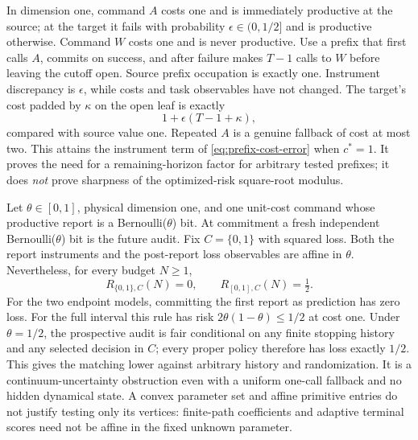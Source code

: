 \begin{example}\label{ex:cost-horizon}
In dimension one, command $A$ costs one and is immediately productive at the source; at the target it fails with probability $\epsilon\in(0,1/2]$ and is productive otherwise. Command $W$ costs one and is never productive. Use a prefix that first calls $A$, commits on success, and after failure makes $T-1$ calls to $W$ before leaving the cutoff open. Source prefix occupation is exactly one. Instrument discrepancy is $\epsilon$, while costs and task observables have not changed. The target's cost padded by $\kappa$ on the open leaf is exactly
\[
 1+\epsilon(T-1+\kappa),
\]
compared with source value one. Repeated $A$ is a genuine fallback of cost at most two. This attains the instrument term of \eqref{eq:prefix-cost-error} when $c^*=1$. It proves the need for a remaining-horizon factor for arbitrary tested prefixes; it does \emph{not} prove sharpness of the optimized-risk square-root modulus.
\end{example}

\begin{example}\label{ex:vertex-risk}
Let $\theta\in[0,1]$, physical dimension one, and one unit-cost command whose productive report is a Bernoulli($\theta$) bit. At commitment a fresh independent Bernoulli($\theta$) bit is the future audit. Fix $C=\{0,1\}$ with squared loss. Both the report instruments and the post-report loss observables are affine in $\theta$. Nevertheless, for every budget $N\ge1$,
\[
 R_{\{0,1\},C}(N)=0,\qquad R_{[0,1],C}(N)=\tfrac12.
\]
For the two endpoint models, committing the first report as prediction has zero loss. For the full interval this rule has risk $2\theta(1-\theta)\le1/2$ at cost one. Under $\theta=1/2$, the prospective audit is fair conditional on any finite stopping history and any selected decision in $C$; every proper policy therefore has loss exactly $1/2$. This gives the matching lower against arbitrary history and randomization. It is a continuum-uncertainty obstruction even with a uniform one-call fallback and no hidden dynamical state. A convex parameter set and affine primitive entries do not justify testing only its vertices: finite-path coefficients and adaptive terminal scores need not be affine in the fixed unknown parameter.
\end{example}

